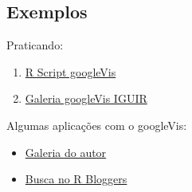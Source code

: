 

\subsection{Exemplos}

\begin{frame}

 Praticando:
  \begin{enumerate}
  \item \href{run:./R/googleVis/googleVis.R}{R Script googleVis}
  \item \href{run:googleVis.html}{Galeria googleVis IGUIR}
  \end{enumerate}

  \vspace{0.5cm}
  Algumas aplicações com o googleVis:
  \begin{itemize}
  \item \href{http://cran.r-project.org/web/packages/googleVis/vignettes/}{Galeria
      do autor}
  \item \href{http://www.r-bloggers.com/?s=googleVis}{Busca no R
      Bloggers}
  \end{itemize}

\end{frame}
